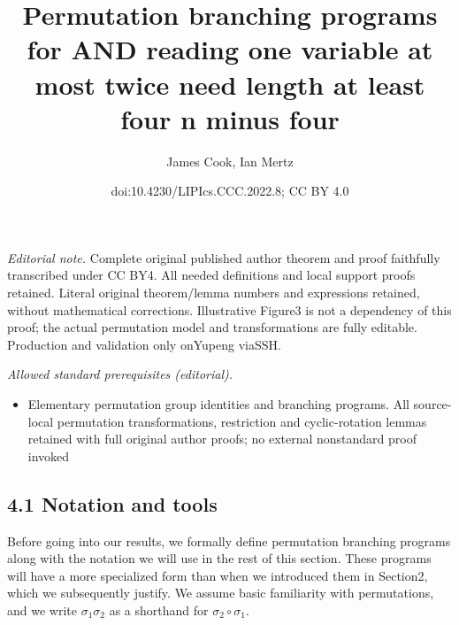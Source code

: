 \documentclass[10pt,a4paper]{article}
\title{Permutation branching programs for AND reading one variable at most twice need length at least four n minus four}
\author{James Cook, Ian Mertz}
\date{doi:10.4230/LIPIcs.CCC.2022.8; CC BY 4.0}
\begin{document}
\maketitle
\noindent\textit{Editorial note.} Complete original published author theorem and proof faithfully transcribed under CC BY4. All needed definitions and local support proofs retained. Literal original theorem/lemma numbers and expressions retained, without mathematical corrections. Illustrative Figure3 is not a dependency of this proof; the actual permutation model and transformations are fully editable. Production and validation only onYupeng viaSSH.\par\medskip
\noindent\textit{Allowed standard prerequisites (editorial).}\begin{itemize}
\item Elementary permutation group identities and branching programs. All source-local permutation transformations, restriction and cyclic-rotation lemmas retained with full original author proofs; no external nonstandard proof invoked
\end{itemize}\medskip
\subsection*{4.1 Notation and tools}
Before going into our results, we formally define permutation branching programs along with the notation we will use in the rest of this section. These programs will have a more specialized form than when we introduced them in Section2, which we subsequently justify. We assume basic familiarity with permutations, and we write $\sigma_1\sigma_2$ as a shorthand for $\sigma_2\circ\sigma_1$.
\end{document}
